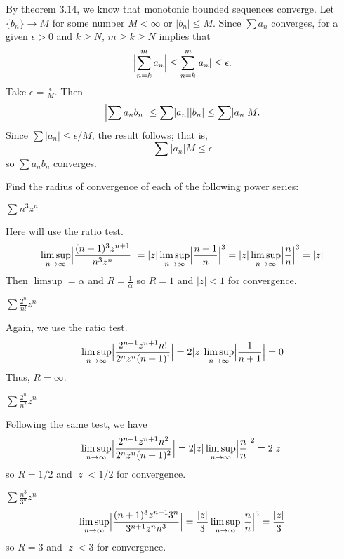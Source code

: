 \begin{exercise}
  By theorem \(3.14\), we know that monotonic bounded sequences converge.
  Let \(\{b_n\}\to M\) for some number \(M < \infty\) or
  \(\lvert b_n\rvert\leq M\).
  Since \(\sum a_n\) converges, for a given \(\epsilon > 0\) and \(k\geq N\),
  \(m\geq k\geq N\) implies that
  \[
  \Bigl\lvert\sum_{n = k}^ma_n\Bigr\rvert\leq\sum_{n = k}^m\lvert a_n\rvert\leq
  \epsilon.
  \]
  Take \(\epsilon = \frac{\epsilon}{M}\).
  Then
  \[
  \Bigl\lvert\sum a_nb_n\Bigr\rvert\leq\sum\lvert a_n\rvert\lvert b_n\rvert\leq
  \sum\lvert a_n\rvert M.
  \]
  Since \(\sum\lvert a_n\rvert\leq\epsilon/M\), the result follows; that is,
  \[
  \sum\lvert a_n\rvert M\leq\epsilon
  \]
  so \(\sum a_nb_n\) converges.
\item
  Find the radius of convergence of each of the following power series:
  \begin{exercise}[label = (\alph*)]
  \item
    \(\sum n^3z^n\)
    \par\smallskip
    Here will use the ratio test.
    \[
    \limsup_{n\to\infty}\Bigl\lvert\frac{(n + 1)^3z^{n + 1}}{n^3z^n}\Bigr\rvert
    = \lvert z\rvert\limsup_{n\to\infty}\Bigl\lvert\frac{n + 1}{n}\Bigr\rvert^3
    = \lvert z\rvert\limsup_{n\to\infty}\Bigl\lvert\frac{n}{n}\Bigr\rvert^3 =
    \lvert z\rvert
    \]
    Then \(\limsup = \alpha\) and \(R = \frac{1}{\alpha}\) so \(R = 1\) and
    \(\lvert z\rvert < 1\) for convergence.
  \item
    \(\sum\frac{2^n}{n!}z^n\)
    \par\smallskip
    Again, we use the ratio test.
    \[
    \limsup_{n\to\infty}\Bigl\lvert
    \frac{2^{n + 1}z^{n + 1}n!}{2^nz^n(n + 1)!}\Bigr\rvert =
    2\lvert z\rvert\limsup_{n\to\infty}\Bigl\lvert\frac{1}{n + 1}\Bigr\rvert =
    0
    \]
    Thus, \(R = \infty\).
  \item
    \(\sum\frac{2^n}{n^2}z^n\)
    \par\smallskip
    Following the same test, we have
    \[
    \limsup_{n\to\infty}\Bigl\lvert
    \frac{2^{n + 1}z^{n + 1}n^2}{2^nz^n(n + 1)^2}\Bigr\rvert =
    2\lvert z\rvert\limsup_{n\to\infty}\Bigl\lvert\frac{n}{n}\Bigr\rvert^2 =
    2\lvert z\rvert
    \]
    so \(R = 1/2\) and \(\lvert z\rvert < 1/2\) for convergence.
  \item
    \(\sum\frac{n^3}{3^n}z^n\)
    \[
    \limsup_{n\to\infty}\Bigl\lvert
    \frac{(n + 1)^3z^{n + 1}3^n}{3^{n + 1}z^nn^3}\Bigr\rvert =
    \frac{\lvert z\rvert}{3}
    \limsup_{n\to\infty}\Bigl\lvert\frac{n}{n}\Bigr\rvert^3 =
    \frac{\lvert z\rvert}{3}
    \]
    so \(R = 3\) and \(\lvert z\rvert < 3\) for convergence.

\end{exercise}
\end{exercise}
